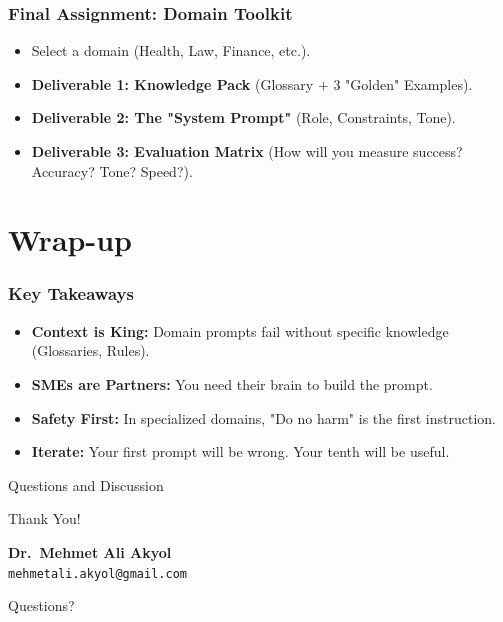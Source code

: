 \documentclass{beamer}
\begin{document}
\begin{frame}
    \frametitle{Final Assignment: Domain Toolkit}
    \begin{itemize}
        \item Select a domain (Health, Law, Finance, etc.).
        \item \textbf{Deliverable 1: Knowledge Pack} (Glossary + 3 "Golden" Examples).
        \item \textbf{Deliverable 2: The "System Prompt"} (Role, Constraints, Tone).
        \item \textbf{Deliverable 3: Evaluation Matrix} (How will you measure success? Accuracy? Tone? Speed?).
    \end{itemize}
\end{frame}

\section{Wrap-up}

\begin{frame}
    \frametitle{Key Takeaways}
    \begin{itemize}
        \item \textbf{Context is King:} Domain prompts fail without specific knowledge (Glossaries, Rules).
        \item \textbf{SMEs are Partners:} You need their brain to build the prompt.
        \item \textbf{Safety First:} In specialized domains, "Do no harm" is the first instruction.
        \item \textbf{Iterate:} Your first prompt will be wrong. Your tenth will be useful.
    \end{itemize}
\end{frame}

\begin{frame}{Questions and Discussion}
    \begin{center}
    {\Huge Thank You!}
    \vspace{1cm}

        \textbf{Dr.\ Mehmet Ali Akyol}\\
        \texttt{mehmetali.akyol@gmail.com}
    \vspace{1cm}

    {\large Questions?}
    \end{center}
\end{frame}
\end{document}
